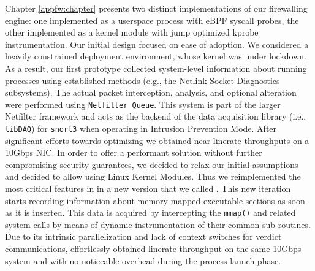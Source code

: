 Chapter \ref{appfw:chapter} presents two distinct implementations of our
firewalling engine: one implemented as a userspace process with eBPF syscall
probes, the other implemented as a kernel module with jump optimized kprobe
instrumentation. Our initial design focused on ease of adoption. We considered
a heavily constrained deployment environment, whose kernel was under lockdown.
As a result, our first prototype \daf{} collected system-level information about
running processes using established methods (e.g., the Netlink Socket Diagnostics
subsystems). The actual packet interception, analysis, and optional alteration
were performed using \texttt{Netfilter Queue}. This system is part of the larger
Netfilter framework and acts as the backend of the data acquisition library
(i.e., \texttt{libDAQ}) for \texttt{snort3} when operating in Intrusion Prevention
Mode. After significant efforts towards optimizing \daf{} we obtained near linerate
throughputs on a 10Gbps NIC. In order to offer a performant solution without
further compromising security guarantees, we decided to relax our initial
assumptions and decided to allow using Linux Kernel Modules. Thus we reimplemented
the most critical features in \daf{} in a new version that we called \scout{}.
This new iteration starts recording information about memory mapped executable
sections as soon as it is inserted. This data is acquired by intercepting
the \texttt{mmap()} and related system calls by means of dynamic instrumentation
of their common sub-routines. Due to its intrinsic parallelization and lack
of context switches for verdict communications, \scout{} effortlessly obtained
linerate throughput on the same 10Gbps system and with no noticeable overhead
during the process launch phase.

